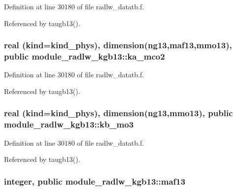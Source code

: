 Definition at line 30180 of file radlw\+\_\+datatb.\+f.



Referenced by taugb13().

\subsubsection[{\texorpdfstring{ka\+\_\+mco2}{ka_mco2}}]{\setlength{\rightskip}{0pt plus 5cm}real (kind=kind\+\_\+phys), dimension(ng13,{\bf maf13},{\bf mmo13}), public module\+\_\+radlw\+\_\+kgb13\+::ka\+\_\+mco2}\hypertarget{namespacemodule__radlw__kgb13_a523a0bc861ea861869f59b7bd007ff50}{}\label{namespacemodule__radlw__kgb13_a523a0bc861ea861869f59b7bd007ff50}


Definition at line 30180 of file radlw\+\_\+datatb.\+f.



Referenced by taugb13().

\subsubsection[{\texorpdfstring{kb\+\_\+mo3}{kb_mo3}}]{\setlength{\rightskip}{0pt plus 5cm}real (kind=kind\+\_\+phys), dimension(ng13,{\bf mmo13}), public module\+\_\+radlw\+\_\+kgb13\+::kb\+\_\+mo3}\hypertarget{namespacemodule__radlw__kgb13_acc93fbdd9ce1062cbe9b01973d8ab229}{}\label{namespacemodule__radlw__kgb13_acc93fbdd9ce1062cbe9b01973d8ab229}


Definition at line 30180 of file radlw\+\_\+datatb.\+f.



Referenced by taugb13().

\subsubsection[{\texorpdfstring{maf13}{maf13}}]{\setlength{\rightskip}{0pt plus 5cm}integer, public module\+\_\+radlw\+\_\+kgb13\+::maf13}\hypertarget{namespacemodule__radlw__kgb13_a1ddc025df872b12194b8c6344cc0204e}{}\label{namespacemodule__radlw__kgb13_a1ddc025df872b12194b8c6344cc0204e}


